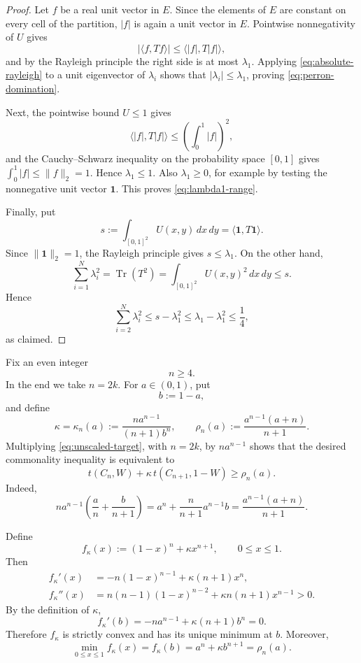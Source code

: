 \documentclass[11pt]{article}
\theoremstyle{definition}
\theoremstyle{remark}
\newcommand{\one}{\mathbf{1}}
\newcommand{\tr}{\operatorname{Tr}}
\begin{document}
\begin{proof}
  Let $f$ be a real unit vector in $E$.  Since the elements of $E$ are
  constant on every cell of the partition, $|f|$ is again a unit vector in
  $E$.  Pointwise nonnegativity of $U$ gives
  \begin{equation}
    |\langle f,Tf\rangle|
    \le
    \langle |f|,T|f|\rangle,
    \label{eq:absolute-rayleigh}
  \end{equation}
  and by the Rayleigh principle the right side is at most $\lambda_1$.
  Applying \eqref{eq:absolute-rayleigh} to a unit eigenvector of $\lambda_i$
  shows that $|\lambda_i|\le\lambda_1$, proving
  \eqref{eq:perron-domination}.

  Next, the pointwise bound $U\le1$ gives
  \[
    \langle |f|,T|f|\rangle
    \le
    \left(\int_0^1|f|\right)^2,
  \]
  and the Cauchy--Schwarz inequality on the probability space $[0,1]$ gives
  $\int_0^1|f|\le\|f\|_2=1$.  Hence $\lambda_1\le1$.  Also $\lambda_1\ge0$,
  for example by testing the nonnegative unit vector $\one$.  This proves
  \eqref{eq:lambda1-range}.

  Finally, put
  \[
    s:=\int_{[0,1]^2}U(x,y)\,dx\,dy
    =\langle\one,T\one\rangle.
  \]
  Since $\|\one\|_2=1$, the Rayleigh principle gives $s\le\lambda_1$.  On the
  other hand,
  \[
    \sum_{i=1}^N\lambda_i^2
    =\tr(T^2)
    =\int_{[0,1]^2}U(x,y)^2\,dx\,dy
    \le s.
  \]
  Hence
  \[
    \sum_{i=2}^N\lambda_i^2
    \le s-\lambda_1^2
    \le\lambda_1-\lambda_1^2
    \le\frac14,
  \]
  as claimed.
\end{proof}

Fix an even integer
\[
  n\ge4.
\]
In the end we take $n=2k$.  For $a\in(0,1)$, put
\[
  b:=1-a,
\]
and define
\begin{equation}
  \kappa=\kappa_n(a)
  :=\frac{n a^{n-1}}{(n+1)b^n},
  \qquad
  \rho_n(a)
  :=\frac{a^{n-1}(a+n)}{n+1}.
  \label{eq:kappa-rho}
\end{equation}
Multiplying \eqref{eq:unscaled-target}, with $n=2k$, by $na^{n-1}$ shows
that the desired commonality inequality is equivalent to
\begin{equation}
  t(C_n,W)+\kappa\,t(C_{n+1},1-W)
  \ge\rho_n(a).
  \label{eq:scaled-target}
\end{equation}
Indeed,
\[
  na^{n-1}
  \left(\frac an+\frac b{n+1}\right)
  =a^n+\frac{n}{n+1}a^{n-1}b
  =\frac{a^{n-1}(a+n)}{n+1}.
\]

Define
\begin{equation}
  f_\kappa(x):=(1-x)^n+\kappa x^{n+1},
  \qquad 0\le x\le1.
  \label{eq:f-kappa}
\end{equation}
Then
\begin{align*}
  f_\kappa'(x)
  &=-n(1-x)^{n-1}+\kappa(n+1)x^n,\\
  f_\kappa''(x)
  &=n(n-1)(1-x)^{n-2}+\kappa n(n+1)x^{n-1}>0.
\end{align*}
By the definition of $\kappa$,
\[
  f_\kappa'(b)
  =-na^{n-1}+\kappa(n+1)b^n
  =0.
\]
Therefore $f_\kappa$ is strictly convex and has its unique minimum at $b$.
Moreover,
\begin{equation}
  \min_{0\le x\le1}f_\kappa(x)
  =f_\kappa(b)
  =a^n+\kappa b^{n+1}
  =\rho_n(a).
  \label{eq:scalar-minimum}
\end{equation}
\end{document}
